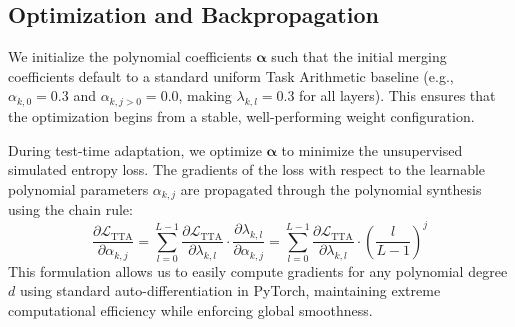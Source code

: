 \subsection{Optimization and Backpropagation}
We initialize the polynomial coefficients $\boldsymbol{\alpha}$ such that the initial merging coefficients default to a standard uniform Task Arithmetic baseline (e.g., $\alpha_{k, 0} = 0.3$ and $\alpha_{k, j > 0} = 0.0$, making $\lambda_{k, l} = 0.3$ for all layers). This ensures that the optimization begins from a stable, well-performing weight configuration.

During test-time adaptation, we optimize $\boldsymbol{\alpha}$ to minimize the unsupervised simulated entropy loss. The gradients of the loss with respect to the learnable polynomial parameters $\alpha_{k, j}$ are propagated through the polynomial synthesis using the chain rule:
\begin{equation}
\frac{\partial \mathcal{L}_{\text{TTA}}}{\partial \alpha_{k, j}} = \sum_{l=0}^{L-1} \frac{\partial \mathcal{L}_{\text{TTA}}}{\partial \lambda_{k, l}} \cdot \frac{\partial \lambda_{k, l}}{\partial \alpha_{k, j}} = \sum_{l=0}^{L-1} \frac{\partial \mathcal{L}_{\text{TTA}}}{\partial \lambda_{k, l}} \cdot \left( \frac{l}{L-1} \right)^j
\end{equation}
This formulation allows us to easily compute gradients for any polynomial degree $d$ using standard auto-differentiation in PyTorch, maintaining extreme computational efficiency while enforcing global smoothness.

